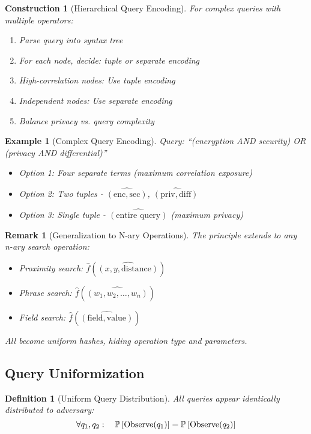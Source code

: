 \documentclass[11pt,final]{article}
\newtheorem{definition}[theorem]{Definition}
\newtheorem{example}[theorem]{Example}
\newtheorem{remark}[theorem]{Remark}
\newtheorem{construction}[theorem]{Construction}
\begin{document}
\begin{construction}[Hierarchical Query Encoding]
For complex queries with multiple operators:
\begin{enumerate}
    \item Parse query into syntax tree
    \item For each node, decide: tuple or separate encoding
    \item High-correlation nodes: Use tuple encoding
    \item Independent nodes: Use separate encoding
    \item Balance privacy vs. query complexity
\end{enumerate}
\end{construction}

\begin{example}[Complex Query Encoding]
Query: ``(encryption AND security) OR (privacy AND differential)''
\begin{itemize}
    \item Option 1: Four separate terms (maximum correlation exposure)
    \item Option 2: Two tuples - $\widehat{(\text{enc}, \text{sec})}$, $\widehat{(\text{priv}, \text{diff})}$
    \item Option 3: Single tuple - $\widehat{(\text{entire query})}$ (maximum privacy)
\end{itemize}
\end{example}

\begin{remark}[Generalization to N-ary Operations]
The principle extends to any n-ary search operation:
\begin{itemize}
    \item Proximity search: $\hat{f}(\widehat{(x, y, \text{distance})})$
    \item Phrase search: $\hat{f}(\widehat{(w_1, w_2, \ldots, w_n)})$
    \item Field search: $\hat{f}(\widehat{(\text{field}, \text{value})})$
\end{itemize}
All become uniform hashes, hiding operation type and parameters.
\end{remark}

\subsection{Query Uniformization}

\begin{definition}[Uniform Query Distribution]
All queries appear identically distributed to adversary:
\begin{equation}
\forall q_1, q_2: \quad \mathbb{P}\left[\text{Observe}(q_1)\right] = \mathbb{P}\left[\text{Observe}(q_2)\right]
\end{equation}
\end{definition}
\end{document}
